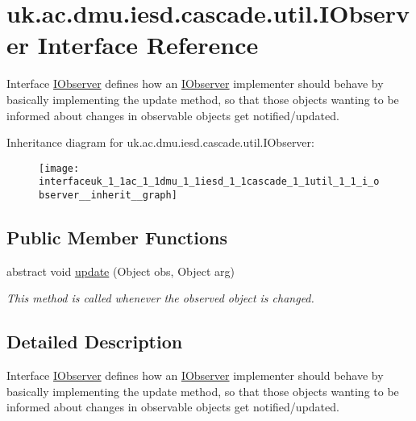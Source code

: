 \hypertarget{interfaceuk_1_1ac_1_1dmu_1_1iesd_1_1cascade_1_1util_1_1_i_observer}{\section{uk.\-ac.\-dmu.\-iesd.\-cascade.\-util.\-I\-Observer Interface Reference}
\label{interfaceuk_1_1ac_1_1dmu_1_1iesd_1_1cascade_1_1util_1_1_i_observer}
}


Interface {\ttfamily \hyperlink{interfaceuk_1_1ac_1_1dmu_1_1iesd_1_1cascade_1_1util_1_1_i_observer}{I\-Observer}} defines how an \hyperlink{interfaceuk_1_1ac_1_1dmu_1_1iesd_1_1cascade_1_1util_1_1_i_observer}{I\-Observer} implementer should behave by basically implementing the update method, so that those objects wanting to be informed about changes in observable objects get notified/updated.  




Inheritance diagram for uk.\-ac.\-dmu.\-iesd.\-cascade.\-util.\-I\-Observer\-:\nopagebreak
\begin{figure}[H]
\begin{center}
\leavevmode
\texttt{[image: interfaceuk\_1\_1ac\_1\_1dmu\_1\_1iesd\_1\_1cascade\_1\_1util\_1\_1\_i\_observer\_\_inherit\_\_graph]}
\end{center}
\end{figure}
\subsection*{Public Member Functions}
\begin{DoxyCompactItemize}
\item 
abstract void \hyperlink{interfaceuk_1_1ac_1_1dmu_1_1iesd_1_1cascade_1_1util_1_1_i_observer_a4a1251fa996fd058f4f1f61c0e9e57e3}{update} (Object obs, Object arg)
\begin{DoxyCompactList}\small\item\em This method is called whenever the observed object is changed. \end{DoxyCompactList}\end{DoxyCompactItemize}


\subsection{Detailed Description}
Interface {\ttfamily \hyperlink{interfaceuk_1_1ac_1_1dmu_1_1iesd_1_1cascade_1_1util_1_1_i_observer}{I\-Observer}} defines how an \hyperlink{interfaceuk_1_1ac_1_1dmu_1_1iesd_1_1cascade_1_1util_1_1_i_observer}{I\-Observer} implementer should behave by basically implementing the update method, so that those objects wanting to be informed about changes in observable objects get notified/updated. 


